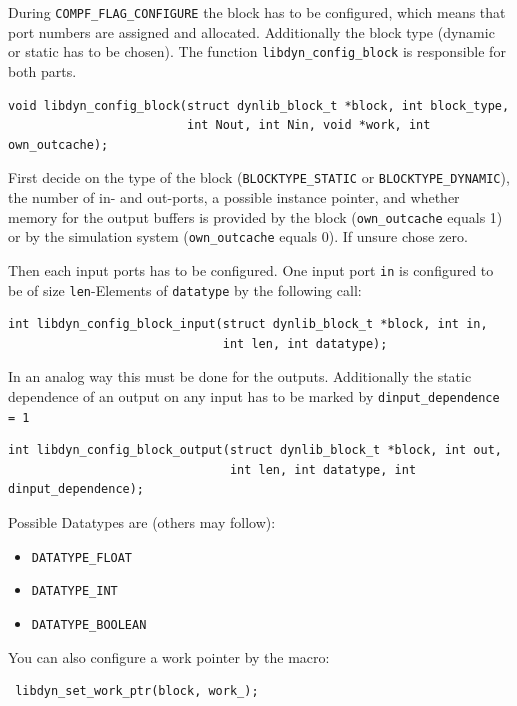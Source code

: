 \documentclass[%
	pdftex,%
	a4paper,%
	oneside,%
	11pt,%
	halfparskip,%
	headsepline,%
	bibtotocnumbered,%
	idxtotoc%
]{scrartcl}
\begin{document}
During \texttt{COMPF\_FLAG\_CONFIGURE} the block has to be configured, which means that port numbers are assigned and allocated. Additionally the block type (dynamic or static has to be chosen). The function \texttt{libdyn\_config\_block} is responsible for both parts.

\begin{verbatim}
void libdyn_config_block(struct dynlib_block_t *block, int block_type, 
                         int Nout, int Nin, void *work, int own_outcache);
\end{verbatim}

First decide on the type of the block (\texttt{BLOCKTYPE\_STATIC} or \texttt{BLOCKTYPE\_DYNAMIC}), the number of in- and out-ports, a possible instance pointer, and whether memory for the output buffers is provided by the block (\texttt{own\_outcache} equals 1) or by the simulation system (\texttt{own\_outcache} equals 0). If unsure chose zero.


Then each input ports has to be configured. One input port \texttt{in} is configured to be of size \texttt{len}-Elements of \texttt{datatype} by the following call:

\begin{verbatim}
int libdyn_config_block_input(struct dynlib_block_t *block, int in, 
                              int len, int datatype);
\end{verbatim}

In an analog way this must be done for the outputs. Additionally the static dependence of an output on any input has to be marked by \texttt{dinput\_dependence = 1}

\begin{verbatim}
int libdyn_config_block_output(struct dynlib_block_t *block, int out, 
                               int len, int datatype, int dinput_dependence);
\end{verbatim}

Possible Datatypes are (others may follow):

\begin{itemize}
 \item \texttt{DATATYPE\_FLOAT} 
 \item \texttt{DATATYPE\_INT}
 \item \texttt{DATATYPE\_BOOLEAN}
\end{itemize}

You can also configure a work pointer by the macro:

\begin{verbatim}
 libdyn_set_work_ptr(block, work_);
\end{verbatim}
\end{document}
